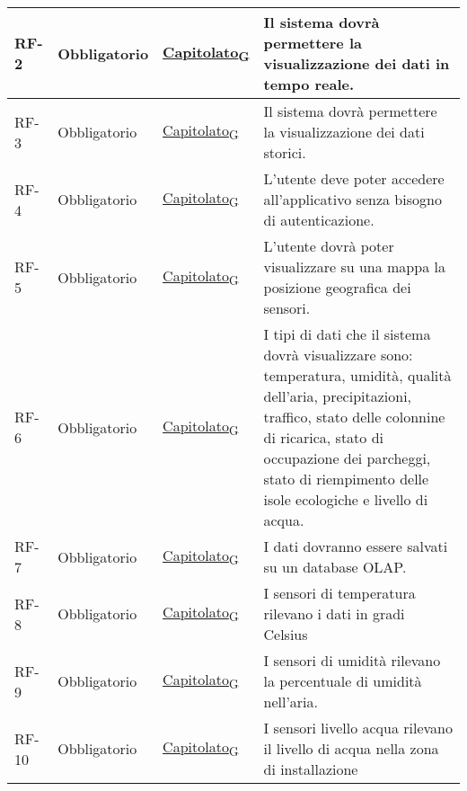 \begin{longtable}{|>{\centering\arraybackslash}m{}|>{\centering\arraybackslash}m{}|>{\centering\arraybackslash}m{}|>{\centering\arraybackslash}m{}|}
	\\\hline
	RF-2            & Obbligatorio        & \href{https://7last.github.io/docs/rtb/documentazione-interna/glossario\#capitolato}{Capitolato\textsubscript{G}} & Il sistema dovrà permettere la visualizzazione dei dati in tempo reale.
	\\\hline
	RF-3            & Obbligatorio        & \href{https://7last.github.io/docs/rtb/documentazione-interna/glossario\#capitolato}{Capitolato\textsubscript{G}} & Il sistema dovrà permettere la visualizzazione dei dati storici.
	\\\hline
	RF-4            & Obbligatorio        & \href{https://7last.github.io/docs/rtb/documentazione-interna/glossario\#capitolato}{Capitolato\textsubscript{G}} & L'utente deve poter accedere all'applicativo senza bisogno di autenticazione.
	\\\hline
	RF-5            & Obbligatorio        & \href{https://7last.github.io/docs/rtb/documentazione-interna/glossario\#capitolato}{Capitolato\textsubscript{G}} & L'utente dovrà poter visualizzare su una mappa la posizione geografica dei sensori.
	\\\hline
	RF-6            & Obbligatorio        & \href{https://7last.github.io/docs/rtb/documentazione-interna/glossario\#capitolato}{Capitolato\textsubscript{G}} & I tipi di dati che il sistema dovrà visualizzare sono: temperatura, umidità, qualità dell'aria, precipitazioni, traffico, stato delle colonnine di ricarica, stato di occupazione dei parcheggi, stato di riempimento delle isole ecologiche e livello di acqua.
	\\\hline
	RF-7            & Obbligatorio        & \href{https://7last.github.io/docs/rtb/documentazione-interna/glossario\#capitolato}{Capitolato\textsubscript{G}} & I dati dovranno essere salvati su un database OLAP.
	\\\hline
	RF-8            & Obbligatorio        & \href{https://7last.github.io/docs/rtb/documentazione-interna/glossario\#capitolato}{Capitolato\textsubscript{G}} & I sensori di temperatura rilevano i dati in gradi Celsius
	\\\hline
	RF-9            & Obbligatorio        & \href{https://7last.github.io/docs/rtb/documentazione-interna/glossario\#capitolato}{Capitolato\textsubscript{G}} & I sensori di umidità rilevano la percentuale di umidità nell’aria.
	\\\hline
	RF-10           & Obbligatorio        & \href{https://7last.github.io/docs/rtb/documentazione-interna/glossario\#capitolato}{Capitolato\textsubscript{G}} & I sensori livello acqua rilevano il livello di acqua nella zona di installazione

\end{longtable}
